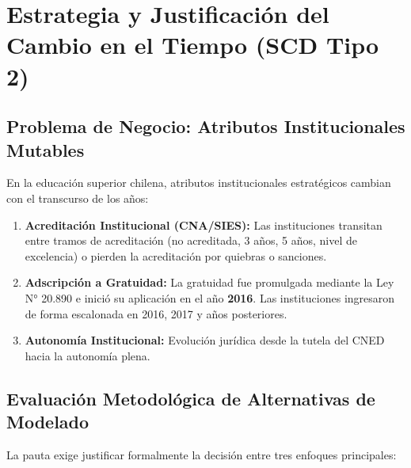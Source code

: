 \documentclass[11pt,a4paper]{article}
\begin{document}
\section{Estrategia y Justificación del Cambio en el Tiempo (SCD Tipo 2)}
\label{sec:scd2}

\subsection{Problema de Negocio: Atributos Institucionales Mutables}
En la educación superior chilena, atributos institucionales estratégicos cambian con el transcurso de los años:
\begin{enumerate}[leftmargin=*]
    \item \textbf{Acreditación Institucional (CNA/SIES):} Las instituciones transitan entre tramos de acreditación (no acreditada, 3 años, 5 años, nivel de excelencia) o pierden la acreditación por quiebras o sanciones.
    \item \textbf{Adscripción a Gratuidad:} La gratuidad fue promulgada mediante la Ley N° 20.890 e inició su aplicación en el año \textbf{2016}. Las instituciones ingresaron de forma escalonada en 2016, 2017 y años posteriores.
    \item \textbf{Autonomía Institucional:} Evolución jurídica desde la tutela del CNED hacia la autonomía plena.
\end{enumerate}

\subsection{Evaluación Metodológica de Alternativas de Modelado}
La pauta exige justificar formalmente la decisión entre tres enfoques principales:
\end{document}
